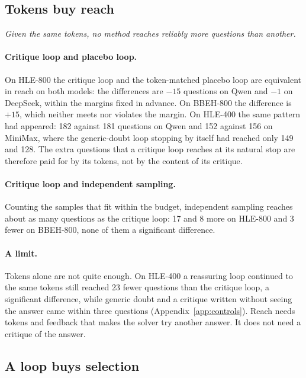 \documentclass[11pt]{article}
\newcommand{\ds}{DeepSeek}
\newcommand{\qw}{Qwen}
\newcommand{\mm}{MiniMax}
\begin{document}
\subsection{Tokens buy reach}
\label{sec:tokens}

\emph{Given the same tokens, no method reaches reliably more questions than another.}

\paragraph{Critique loop and placebo loop.}
On HLE-800 the critique loop and the token-matched placebo loop are equivalent in reach on both models: the differences are $-15$ questions on \qw{} and $-1$ on \ds, within the margins fixed in advance.
On BBEH-800 the difference is $+15$, which neither meets nor violates the margin.
On HLE-400 the same pattern had appeared: 182 against 181 questions on \qw{} and 152 against 156 on \mm, where the generic-doubt loop stopping by itself had reached only 149 and 128.
The extra questions that a critique loop reaches at its natural stop are therefore paid for by its tokens, not by the content of its critique.

\paragraph{Critique loop and independent sampling.}
Counting the samples that fit within the budget, independent sampling reaches about as many questions as the critique loop: 17 and 8 more on HLE-800 and 3 fewer on BBEH-800, none of them a significant difference.

\paragraph{A limit.}
Tokens alone are not quite enough.
On HLE-400 a reassuring loop continued to the same tokens still reached 23 fewer questions than the critique loop, a significant difference, while generic doubt and a critique written without seeing the answer came within three questions (Appendix~\ref{app:controls}).
Reach needs tokens and feedback that makes the solver try another answer. It does not need a critique of the answer.

\subsection{A loop buys selection}
\label{sec:equal}
\end{document}
